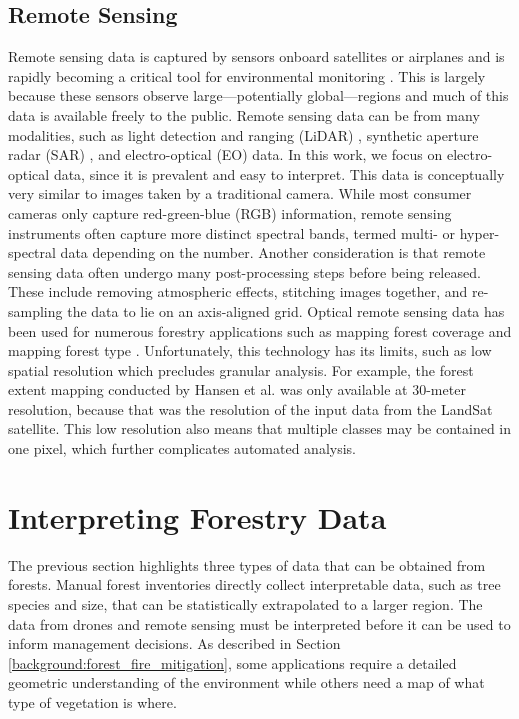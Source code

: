 \subsection{Remote Sensing}
Remote sensing data is captured by sensors onboard satellites or airplanes and is rapidly becoming a critical tool for environmental monitoring \cite{Parra2022RemoteMonitoring}. This is largely because these sensors observe large---potentially global---regions and much of this data is available freely to the public. 
Remote sensing data can be from many modalities, such as light detection and ranging (LiDAR) \cite{LiDARForestryBeland2019}, synthetic aperture radar (SAR) \cite{Hall2020WhatEarthdata}, and electro-optical (EO) data.
In this work, we focus on electro-optical data, since it is prevalent and easy to interpret. This data is conceptually very similar to images taken by a traditional camera. While most consumer cameras only capture red-green-blue (RGB) information, remote sensing instruments often capture more distinct spectral bands, termed multi- or hyper-spectral data depending on the number. Another consideration is that remote sensing data often undergo many post-processing steps before being released. These include removing atmospheric effects, stitching images together, and re-sampling the data to lie on an axis-aligned grid. 
Optical remote sensing data has been used for numerous forestry applications such as mapping forest coverage \cite{ Hansen2013High-resolutionChange} and mapping forest type \cite{Kempeneers2011DataMapping}. Unfortunately, this technology has its limits, such as low spatial resolution which precludes granular analysis. For example, the forest extent mapping conducted by Hansen et al. \cite{Hansen2013High-resolutionChange} was only available at 30-meter resolution, because that was the resolution of the input data from the LandSat \cite{LandSat} satellite. This low resolution also means that multiple classes may be contained in one pixel, which further complicates automated analysis. 

\section{Interpreting Forestry Data}
The previous section highlights three types of data that can be obtained from forests. Manual forest inventories directly collect interpretable data, such as tree species and size, that can be statistically extrapolated to a larger region. The data from drones and remote sensing must be interpreted before it can be used to inform management decisions. As described in Section \ref{background:forest_fire_mitigation}, some applications require a detailed geometric understanding of the environment while others need a map of what type of vegetation is where.

